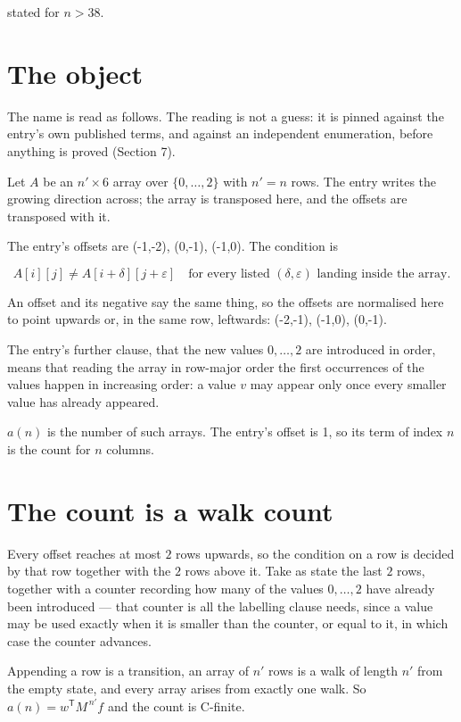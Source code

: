 \documentclass[11pt]{article}
\theoremstyle{definition}
\begin{document}
stated for $n > 38$.

\section{The object}

The name is read as follows. The reading is not a guess: it is pinned against the entry's own published terms, and against an independent enumeration, before anything is proved (Section 7).

Let $A$ be an $n' \times 6$ array over $\{0,\dots,2\}$ with $n' = n$ rows. The entry writes the growing direction across; the array is transposed here, and the offsets are transposed with it.

The entry's offsets are (-1,-2), (0,-1), (-1,0). The condition is

\[A[i][j] \ne A[i{+}\delta][j{+}\varepsilon]\quad\text{for every listed }(\delta,\varepsilon)\text{ landing inside the array.}\]

An offset and its negative say the same thing, so the offsets are normalised here to point upwards or, in the same row, leftwards: (-2,-1), (-1,0), (0,-1).

The entry's further clause, that the new values $0,\dots,2$ are introduced in order, means that reading the array in row-major order the first occurrences of the values happen in increasing order: a value $v$ may appear only once every smaller value has already appeared.

$a(n)$ is the number of such arrays. The entry's offset is 1, so its term of index $n$ is the count for $n$ columns.

\section{The count is a walk count}

Every offset reaches at most $2$ rows upwards, so the condition on a row is decided by that row together with the $2$ rows above it. Take as state the last $2$ rows, together with a counter recording how many of the values $0,\dots,2$ have already been introduced --- that counter is all the labelling clause needs, since a value may be used exactly when it is smaller than the counter, or equal to it, in which case the counter advances.

Appending a row is a transition, an array of $n'$ rows is a walk of length $n'$ from the empty state, and every array arises from exactly one walk. So $a(n) = w^{\mathsf T}M^{\,n'}f$ and the count is C-finite.
\end{document}
